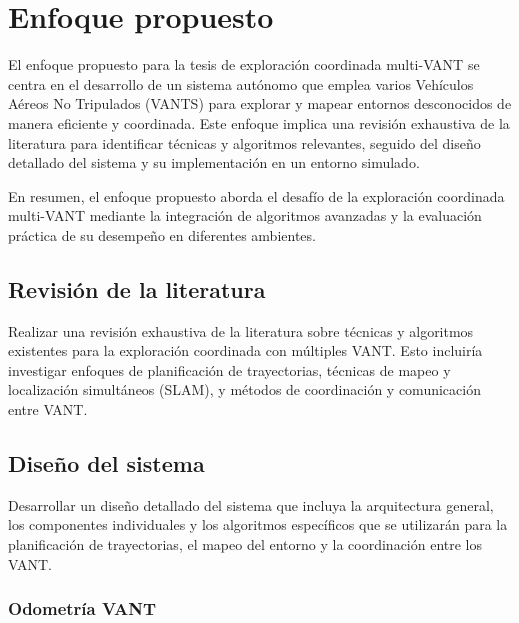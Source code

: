 \chapter{Enfoque propuesto}

El enfoque propuesto para la tesis de exploración coordinada multi-VANT se centra en el desarrollo de un sistema autónomo que emplea varios Vehículos Aéreos No Tripulados (VANTS) para explorar y mapear entornos desconocidos de manera eficiente y coordinada. Este enfoque implica una revisión exhaustiva de la literatura para identificar técnicas y algoritmos relevantes, seguido del diseño detallado del sistema y su implementación en un entorno simulado.

En resumen, el enfoque propuesto aborda el desafío de la exploración coordinada multi-VANT mediante la integración de algoritmos avanzadas y la evaluación práctica de su desempeño en diferentes ambientes.


\section{Revisión de la literatura}

Realizar una revisión exhaustiva de la literatura sobre técnicas y algoritmos existentes para la exploración coordinada con múltiples VANT. Esto incluiría investigar enfoques de planificación de trayectorias, técnicas de mapeo y localización simultáneos (SLAM), y métodos de coordinación y comunicación entre VANT.

\section{Diseño del sistema}

Desarrollar un diseño detallado del sistema que incluya la arquitectura general, los componentes individuales y los algoritmos específicos que se utilizarán para la planificación de trayectorias, el mapeo del entorno y la coordinación entre los VANT.

\subsection*{Odometría VANT}
